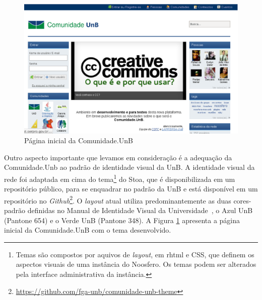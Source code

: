 \begin{figure}[h]
    \centering
    \includegraphics[keepaspectratio=true,scale=0.4]
      {figuras/comunidade.unb.br.eps}
    \caption{Página inicial da Comunidade.UnB}
    \label{comunidade-unb}
\end{figure}

Outro aspecto importante que levamos em consideração é a adequação da
Comunidade.Unb ao padrão de identidade visual da UnB.
A identidade visual da rede foi adaptada em cima do tema\footnote{Temas são
compostos por aquivos de \textit{layout}, em rhtml e CSS, que definem os aspectos
visuais de uma instância do Noosfero. Os temas podem ser alterados pela interface
administrativa da instância.} do Stoa, que é disponibilizada em um repositório
público, para se enquadrar no padrão da UnB e está disponível em um repositório
no \textit{Github}\footnote{\url{https://github.com/fga-unb/comunidade-unb-theme}}.
%
O \textit{layout} atual utiliza predominantemente as duas cores-padrão definidas
no Manual de Identidade Visual da Universidade~\cite{visualUnB}, o Azul UnB
(Pantone 654) e o Verde UnB (Pantone 348). A Figura \ref{comunidade-unb}
apresenta a página inicial da Comunidade.UnB com o tema desenvolvido.





